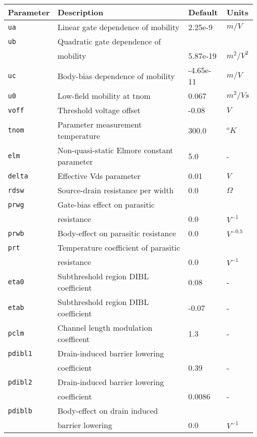 \documentclass{article}
\begin{document}
\newpage
\begin{table}[H]
\begin{tabular}{|l| l| l| l|}
\hline
\textbf{Parameter} & \textbf{Description} & \textbf{Default} & \textbf{Units} \\
\hline
\texttt{ua} & Linear gate dependence of mobility & 2.25e-9 & $m/V$\\
\texttt{ub} & Quadratic gate dependence of & & \\
            & mobility & 5.87e-19 & $m^2/V^2$\\
\texttt{uc} & Body-bias dependence of mobility & -4.65e-11 & $m/V$\\
\texttt{u0} & Low-field mobility at tnom & 0.067 & $m^2/Vs$\\
\texttt{voff} & Threshold voltage offset & -0.08 & $V$\\
\texttt{tnom} & Parameter measurement temperature & 300.0 & $ ^oK$\\
\texttt{elm} & Non-quasi-static Elmore constant parameter & 5.0 & - \\
\texttt{delta} & Effective Vds parameter & 0.01 & $V$\\
\texttt{rdsw} & Source-drain resistance per width & 0.0 & $\Omega$\\
\texttt{prwg} & Gate-bias effect on parasitic & &\\
              & resistance & 0.0 & $V^{-1}$\\
\texttt{prwb} & Body-effect on parasitic resistance & 0.0 & $V^{-0.5}$\\
\texttt{prt} & Temperature coefficient of parasitic & &\\
             & resistance & 0.0 & $V^{-1}$\\
\texttt{eta0} & Subthreshold region DIBL coefficient & 0.08 & - \\
\texttt{etab} & Subthreshold region DIBL coefficient & -0.07 & -\\
\texttt{pclm} & Channel length modulation coefficent & 1.3 & - \\
\texttt{pdibl1} & Drain-induced barrier lowering & & \\
                & coefficient & 0.39 & - \\
\texttt{pdibl2} & Drain-induced barrier lowering & & \\
                & coefficient & 0.0086 & - \\
\texttt{pdiblb} & Body-effect on drain induced & & \\
                 & barrier lowering & 0.0 & $V^{-1}$\\

\end{tabular}
\end{table}
\end{document}
